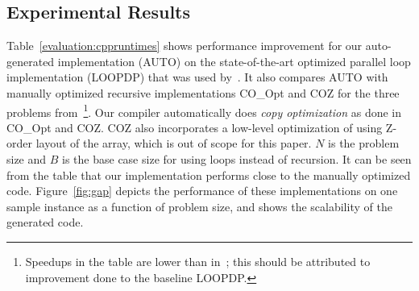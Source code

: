 \cbstart{}%
\subsection{Experimental Results}
\label{evaluation:experimental}
\cbend

Table~\ref{evaluation:cppruntimes} shows performance improvement for our 
auto-generated implementation (AUTO) on the state-of-the-art optimized parallel
loop implementation (LOOPDP) that was used by~\cite{IPDPS15/Tithi}. It also compares AUTO with manually 
optimized recursive implementations CO\_Opt and COZ for the three problems from~\cite{IPDPS15/Tithi}\footnote{Speedups in the table are lower than in~\cite{IPDPS15/Tithi}; this should be attributed to improvement done to the
baseline LOOPDP.}. 
Our compiler automatically does \textit{copy optimization} 
as done in CO\_Opt and COZ. COZ also incorporates a low-level 
optimization of using Z-order layout of the array,
which is out of scope for this paper. %
$N$ is the problem size and $B$ is the base case size for using loops 
instead of recursion. It can be seen from the table that our \cbdelete{} implementation 
performs close to the manually optimized code.
Figure~\ref{fig:gap} depicts the performance of these implementations on one sample instance
as a function of problem size, and shows the scalability of the generated code. 

